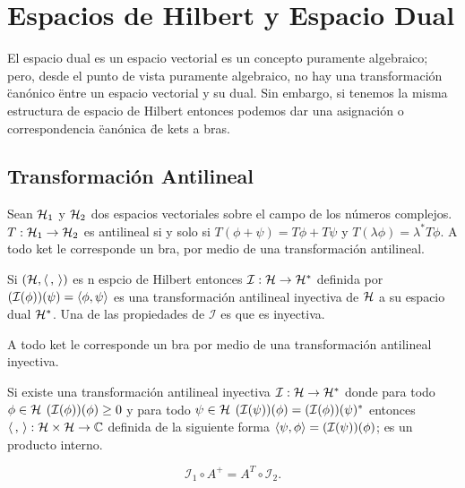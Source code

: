 \section{Espacios de Hilbert y Espacio Dual}
El espacio dual es un espacio vectorial es un concepto puramente algebraico; pero, desde el punto de vista puramente algebraico, no hay una transformación \"canónico \" entre un espacio vectorial y su dual. Sin embargo, si tenemos la misma estructura de espacio de Hilbert entonces podemos dar una asignación o correspondencia \" canónica \" de kets a bras.

\subsection{Transformación Antilineal}
Sean  $\mathcal{H} _1$ y $\mathcal{H} _2$ dos espacios vectoriales sobre el campo de los números complejos. $T:\mathcal{H} _1 \to \mathcal{H} _2$ es antilineal si y solo si $T(\phi + \psi) = T\phi + T\psi$ y $T(\lambda \phi) = \lambda ^* T\phi$. A todo ket le corresponde un bra, por medio de una transformación antilineal.

\begin{teorema}
	Si $(\mathcal{H} ,\langle \, , \, \rangle)$ es n espcio de Hilbert entonces $\mathcal{I} : \mathcal{H} \to \mathcal{H} ^*$ definida por $\qty(\mathcal{I} (\phi)) (\psi) = \langle \phi , \psi \rangle$ es una transformación antilineal inyectiva de $\mathcal{H}$ a su espacio dual $\mathcal{H} ^*$. Una de las propiedades de $\mathcal{I}$ es que es inyectiva.
\end{teorema}

\begin{tcolorbox}
	A todo ket le corresponde un bra por medio de una transformación antilineal inyectiva.
\end{tcolorbox}


\begin{teorema}
	Si existe una transformación antilineal inyectiva $\mathcal{I}:\mathcal{H} \to \mathcal{H} ^*$ donde para todo $\phi \in \mathcal{H}$ $\qty(\mathcal{I}(\phi)) (\phi) \geq 0$ y para todo $\psi \in \mathcal{H}$ $\qty(\mathcal{I} (\psi)) (\phi) = \qty(\mathcal{I} (\phi)) (\psi) ^*$ entonces $\langle \, , \, \rangle : \mathcal{H} \times \mathcal{H} \to \mathbb{C}$ definida de la siguiente forma $\langle \psi , \phi \rangle = \qty(\mathcal{I} (\psi)) (\phi)$; es un producto interno.
\end{teorema}


\begin{teorema}
	$$ \mathcal{I} _1 \circ A^+ = A^T \circ \mathcal{I}_2. $$
\end{teorema}


